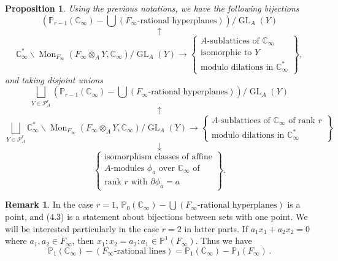 \documentclass[12pt,a4paper]{article}
\theoremstyle{plain}
\newtheorem{proposition}{Proposition}[section]
\theoremstyle{definition}
\newtheorem{remark}{Remark}[section]
\theoremstyle{remark}
\DeclareMathOperator{\Mon}{Mon}
\DeclareMathOperator{\GL}{GL}
\begin{document}
\begin{proposition}
Using the previous notations, we have the following bijections
\[
(\mathbb{P}_{r-1}(\mathbb{C}_\infty) - \bigcup(\text{$F_\infty$-rational hyperplanes}))/\GL_A(Y)
\]
\[
\uparrow
\]
\[
\mathbb{C}_\infty^* \backslash \Mon_{F_\infty}(F_\infty \otimes_A Y, \mathbb{C}_\infty)/\GL_A(Y) \longrightarrow \left\{\substack{\text{$A$-sublattices of $\mathbb{C}_\infty$}\\\text{isomorphic to $Y$}\\\text{modulo dilations in $\mathbb{C}_\infty^*$}}\right\},
\]
and taking disjoint unions
\[
\bigsqcup_{Y \in \mathcal{P}_A^r} (\mathbb{P}_{r-1}(\mathbb{C}_\infty) - \bigcup(\text{$F_\infty$-rational hyperplanes}))/\GL_A(Y)
\]
\[
\uparrow
\]
\[
\bigsqcup_{Y \in \mathcal{P}_A^r} \mathbb{C}_\infty^* \backslash \Mon_{F_\infty}(F_\infty \otimes_A Y, \mathbb{C}_\infty)/\GL_A(Y) \longrightarrow \left\{\substack{\text{$A$-sublattices of $\mathbb{C}_\infty$ of rank $r$}\\\text{modulo dilations in $\mathbb{C}_\infty^*$}}\right\}
\]
\[
\downarrow
\]
\[
\left\{\substack{\text{isomorphism classes of affine}\\\text{$A$-modules $\phi_a$ over $\mathbb{C}_\infty$ of}\\\text{rank $r$ with $\partial\phi_a = a$}}\right\}.
\]
\end{proposition}

\begin{remark}
In the case $r = 1$, $\mathbb{P}_0(\mathbb{C}_\infty) - \bigcup(\text{$F_\infty$-rational hyperplanes})$ 
is a point, and (4.3) is a statement about bijections between sets with one 
point. We will be interested particularly in the case $r = 2$ in latter parts. 
If $a_1 x_1 + a_2 x_2 = 0$ where $a_1, a_2 \in F_\infty$, then 
$x_1 : x_2 = a_2 : a_1 \in \mathbb{P}^1(F_\infty)$. Thus we have
\[
\mathbb{P}_1(\mathbb{C}_\infty) - (\text{$F_\infty$-rational lines}) = \mathbb{P}_1(\mathbb{C}_\infty) - \mathbb{P}_1(F_\infty) \,.
\]
\end{remark}
\end{document}
